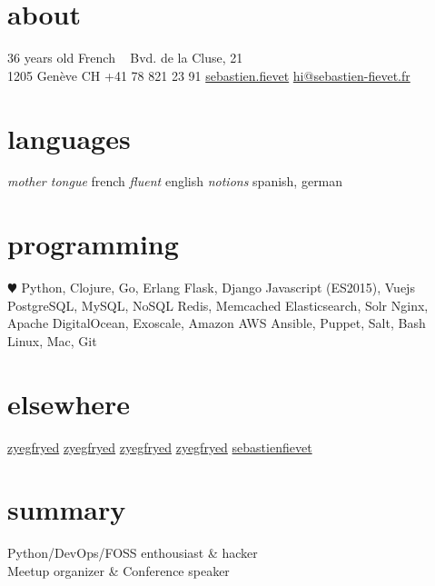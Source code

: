 \documentclass[]{friggeri}
\begin{document}

\begin{acronym}
\end{acronym}

\begin{aside}
  \section{about}
    36 years old
    French
    ~
    {\FA \faHome} Bvd. de la Cluse, 21\\1205 Genève CH
    {\FA \faPhone} +41 78 821 23 91
    \href{skype:sebastienfievet?call}{{\FA \faSkype} sebastien.fievet}
    {\FA \faEnvelope} \href{mailto:hi@sebastien-fievet.fr}{hi@sebastien-fievet.fr}
  \section{languages}
    \emph{mother tongue} french
    \emph{fluent} english
    \emph{notions} spanish, german
  \section{programming}
    {\color{red} $\varheartsuit$} Python, Clojure, Go, Erlang
    Flask, Django
    Javascript (ES2015), Vuejs
    PostgreSQL, MySQL, NoSQL
    Redis, Memcached
    Elasticsearch, Solr
    Nginx, Apache
    DigitalOcean, Exoscale, Amazon AWS
    Ansible, Puppet, Salt, Bash
    Linux, Mac, Git
  \section{elsewhere}
    \href{https://twitter.com/zyegfryed}{{\FA \faTwitter} zyegfryed}
    \href{https://github.com/zyegfryed}{{\FA \faGithub} zyegfryed}
    \href{https://bitbucket.org/zyegfryed}{{\FA \faBitbucket} zyegfryed}
    \href{https://speakerdeck.com/zyegfryed}{{\FA \faBullhorn} zyegfryed}
    \href{http://www.linkedin.com/in/sebastienfievet}{{\FA \faLinkedin} sebastienfievet}
\end{aside}

\section{summary}

Python/DevOps/FOSS enthousiast \& hacker\\
Meetup organizer \& Conference speaker
\end{document}
